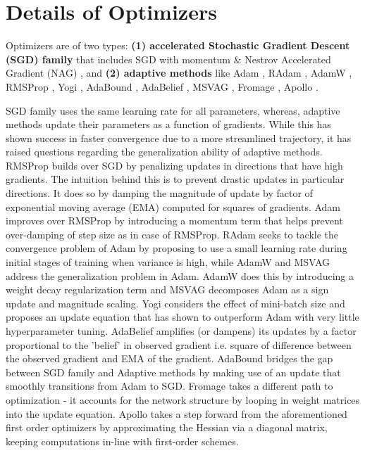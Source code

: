 \section{Details of Optimizers}
Optimizers are of two types: \textbf{(1) accelerated Stochastic Gradient Descent (SGD) family} \cite{SGD} that includes SGD with momentum \cite{Momentum} \& Nestrov Accelerated Gradient (NAG) \cite{NAG}, and \textbf{(2) adaptive methods} like Adam \cite{Adam}, RAdam \cite{liu_variance_2020}, AdamW \cite{AdamW}, RMSProp \cite{RMSProp}, Yogi \cite{Yogi}, AdaBound \cite{AdaBound}, AdaBelief \cite{zhuang_adabelief_2020}, MSVAG \cite{MSVAG}, Fromage \cite{Fromage}, Apollo \cite{Apollo}.

SGD \cite{SGD} family uses the same learning rate for all parameters, whereas, adaptive methods update their parameters as a function of gradients. While this has shown success in faster convergence due to a more streamlined trajectory, it has raised questions regarding the generalization ability of adaptive methods. RMSProp \cite{RMSProp} builds over SGD by penalizing updates in directions that have high gradients. The intuition behind this is to prevent drastic updates in particular directions. It does so by damping the magnitude of update by factor of exponential moving average (EMA) computed for squares of gradients. Adam \cite{Adam} improves over RMSProp by introducing a momentum term that helps prevent over-damping of step size as in case of RMSProp. RAdam \cite{liu_variance_2020} seeks to tackle the convergence problem of Adam by proposing to use a small learning rate during initial stages of training when variance is high, while AdamW \cite{AdamW} and MSVAG \cite{MSVAG} address the generalization problem in Adam. AdamW does this by introducing a weight decay regularization term and MSVAG decomposes Adam as a sign update and magnitude scaling. Yogi \cite{Yogi} considers the effect of mini-batch size and proposes an update equation that has shown to outperform Adam with very little hyperparameter tuning. AdaBelief \cite{zhuang_adabelief_2020} amplifies (or dampens) its updates by a factor proportional to the 'belief' in observed gradient i.e. square of difference between the observed gradient and EMA of the gradient. AdaBound \cite{AdaBound} bridges the gap between SGD family and Adaptive methods by making use of an update that smoothly transitions from Adam to SGD. Fromage \cite{Fromage} takes a different path to optimization - it accounts for the network structure by looping in weight matrices into the update equation. Apollo \cite{Apollo} takes a step forward from the aforementioned first order optimizers by approximating the Hessian via a diagonal matrix, keeping computations in-line with first-order schemes.


